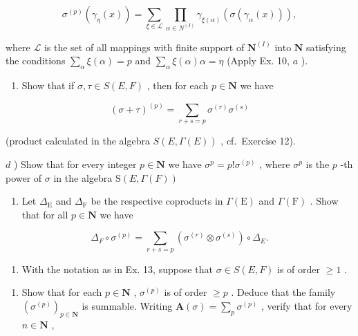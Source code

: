 \[
\sigma^ {(p)} \left(\gamma_ {\eta} (x)\right) = \sum_ {\xi \in \mathscr {L}} \prod_ {\alpha \in N ^ {(I)}} \gamma_ {\xi (\alpha)} \left(\sigma \left(\gamma_ {\alpha} (x)\right)\right),
\]

where \(\mathcal{L}\) is the set of all mappings with finite support of \(\mathbf{N}^{(I)}\) into \(\mathbf{N}\) satisfying the conditions \(\sum_{\alpha} \xi(\alpha) = p\) and \(\sum_{\alpha} \xi(\alpha) \alpha = \eta\) (Apply Ex. 10, \(a\) ).

\begin{enumerate}
\def\labelenumi{\alph{enumi})}
\setcounter{enumi}{2}
\tightlist
\item
  Show that if \(\sigma, \tau \in S(E, F)\) , then for each \(p \in \mathbf{N}\) we have
\end{enumerate}

\[
\left(\sigma + \tau\right) ^ {(p)} = \sum_ {r + s = p} \sigma^ {(r)} \sigma^ {(s)}
\]

(product calculated in the algebra \(S(E, \Gamma(E))\) , cf.~Exercise 12).

\(d\) ) Show that for every integer \(p\in \mathbf{N}\) we have \(\sigma^p = p!\sigma^{(p)}\) , where \(\sigma^p\) is the \(p\) -th power of \(\sigma\) in the algebra \(\mathrm{S}(E, \Gamma(F))\)

\begin{enumerate}
\def\labelenumi{\alph{enumi})}
\setcounter{enumi}{4}
\tightlist
\item
  Let \(\Delta_{\mathrm{E}}\) and \(\Delta_{\mathrm{F}}\) be the respective coproducts in \(\Gamma(\mathrm{E})\) and \(\Gamma(\mathrm{F})\) . Show that for all \(p \in \mathbf{N}\) we have
\end{enumerate}

\[
\Delta_ {F} \circ \sigma^ {(p)} = \sum_ {r + s = p} \left(\sigma^ {(r)} \otimes \sigma^ {(s)}\right) \circ \Delta_ {E}.
\]

\begin{enumerate}
\def\labelenumi{\arabic{enumi})}
\setcounter{enumi}{13}
\tightlist
\item
  With the notation as in Ex. 13, suppose that \(\sigma \in S(E, F)\) is of order \(\geqslant 1\) .
\end{enumerate}

\begin{enumerate}
\def\labelenumi{\alph{enumi})}
\tightlist
\item
  Show that for each \(p \in \mathbf{N}\) , \(\sigma^{(p)}\) is of order \(\geqslant p\) . Deduce that the family \((\sigma^{(p)})_{p \in \mathbf{N}}\) is summable. Writing \(\mathbf{A}(\sigma) = \sum_{p} \sigma^{(p)}\) , verify that for every \(n \in \mathbf{N}\) ,
\end{enumerate}

